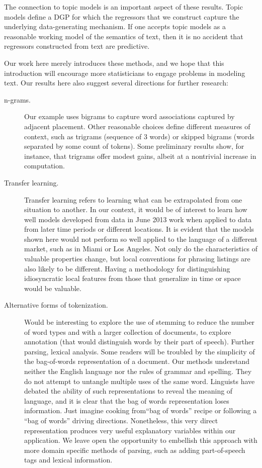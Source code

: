 \documentclass[12pt]{article}
\begin{document}
  
   The connection to topic models is an important aspect of these results.  Topic models define a DGP for which the regressors that we construct capture the underlying data-generating mechanism.  If one accepts topic models as a reasonable working model of the semantics of text, then it is no accident that regressors constructed from text are predictive.


 Our work here merely introduces these methods, and we hope that this introduction will encourage more statisticians to engage problems in  modeling text.  Our results here also suggest several directions for further research:

   \begin{description}
   
   \item[n-grams.]  Our example uses bigrams to capture word associations captured by adjacent placement.  Other reasonable choices define different measures of context,  such as trigrams (sequence of 3 words) or skipped bigrams (words separated by some count of tokens).  Some preliminary results show, for instance, that trigrams offer modest gains, albeit at a nontrivial increase in computation.
   
   \item[Transfer learning.]  Transfer learning refers to learning what can be extrapolated from one situation to another.  In our context, it would be of interest to learn how well models developed from data in June 2013 work when applied to data from later time periods or different locations.  It is evident that the models shown here would not perform so well applied to the language of a different market, such as in Miami or Los Angeles.  Not only do the characteristics of valuable properties change, but  local conventions for phrasing listings are also likely to be different.  Having a methodology for distinguishing idiosyncratic local features from those that generalize in time or space would be valuable. 
   
  \item[Alternative forms of tokenization.] Would be interesting to explore the use of stemming to reduce the number of word types and with a larger collection of documents, to explore annotation (that would distinguish words by their part of speech).  Further parsing, lexical analysis.  Some readers will be troubled by the simplicity of the  bag-of-words representation of a document.  Our methods understand neither the English language nor the rules of grammar and spelling.  They do not attempt to untangle  multiple uses of the same word.  Linguists have debated the ability of such  representations to reveal the meaning of language, and it is clear that the bag of words representation loses information.  Just imagine cooking from``bag of words'' recipe or following a ``bag of words'' driving directions.  Nonetheless, this very direct representation produces very useful explanatory variables within our application.  We leave open the opportunity to embellish this approach with more domain specific methods of parsing, such as adding part-of-speech tags and lexical information.
   

\end{description}
\end{document}
